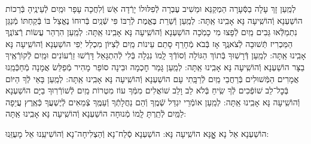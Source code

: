 \documentclass[twoside, openany, parskip=half, 11pt]{book}
\begin{document}
\begin{small}
	לְמַֽעַן זָךְ עָלָה בַסְּֿעָרָה הַמְקַנֵּא וּמֵשִׁיב עֶבְרָה
	לְֿפִלּוּלוֹ יָרְֿדָה אֵשׁ וְֿלִחֲכָה עָפָר וּמַֽיִם לְֿעֵינֶֽיהָ בְּֿרֵכוֹת הוֹשַׁעְנָא וְֿהוֹשִֽׁיעָה נָּא אָבִֽינוּ אַֽתָּה:
	לְמַֽעַן וְֿשֵׁרֵת בֶּאֱמֶת לְֿרַבּוֹ פִּי שְֿׁנַֽיִם בְּֿרוּחוֹ נֶאֱצַל בּוֹ
	בְּֿקַחְתּוֹ מְֿנַגֵּן נִתְמַלְּֿאוּ גֵּבִים מַֽיִם לְֿפָצוּ מִי כָמֹֽכָה הוֹשַׁעְנָא וְֿהוֹשִֽׁיעָה נָּא אָבִֽינוּ אַֽתָּה:
	לְמַֽעַן הִרְהֵר עֲשׂוֹת רְֿצוֹנֶֽךָ הַמַּכְרִיז תְּֿשׁוּבָה לְֿצֹאנֶֽךָ
	אָז בְּֿבֹא מְֿחָרֵף סָתַם עֵינוֹת מַֽיִם לְֿצִיּוֹן מִכְלַל יֹֽפִי הוֹשַׁעְנָא וְֿהוֹשִֽׁיעָה נָּא אָבִֽינוּ אַֽתָּה:
	לְמַֽעַן דְּֿרָשֽׁוּךָ בְּֿתוֹךְ הַגּוֹלָה וְֿסוֹדְֿךָ לָֽמוֹ נִגְלָה
	בְּֿלִי לְֿהִתְגָּאֵל דָּרְֿשׁוּ זֵרְֿעוֹנִים וּמַֽיִם לְֿקוֹרְֿאֶֽיךָ בַצָּר הוֹשַׁעְנָא וְֿהוֹשִֽׁיעָה נָּא אָבִֽינוּ אַֽתָּה:
	לְמַֽעַן גָּמַר חׇכְמָה וּבִינָה סוֹפֵר מָהִיר מְֿפַלֵּשׂ אֲמָנָה
	מְֿחַכְּֿמֵֽנוּ אֲמָרִים הַמְּֿשׁוּלִים בְּֿרַחֲבֵי מַֽיִם לְֿרַבָּֽתִי עָם הוֹשַׁעְנָא וְֿהוֹשִֽׁיעָה נָּא אָבִֽינוּ אַֽתָּה:
	לְמַֽעַן בָּאֵי לְֿךָ הַיּוֹם בְּֿכׇל־לֵב שׁוֹפְֿכִים לְֿךָ שִֽׂיחַ בְּֿלֹא לֵב וָלֵב
	שׁוֹאֲלִים מִמְּֿךָ עוֹז מִטְרוֹת מַֽיִם לְֿשׁוֹרְֿרֽוּךָ בַיָּם הוֹשַׁעְנָא וְֿהוֹשִֽׁיעָה נָּא אָבִֽינוּ אַֽתָּה:
	לְמַֽעַן אוֹמְֿרֵי יִגְדַּל שְֿׁמֶֽךָ וְֿהֵם נַחֲלָתְֿךָ וְֿעַמֶּֽךָ
	צְֿמֵאִים לְֿיֶשְׁעֲךָ כְּֿאֶֽרֶץ עֲיֵפָה לַמַּֽיִם לְֿתַֽרְתָּ לָֽמוֹ מְֿנוּחָה הוֹשַׁעְנָא וְֿהוֹשִֽׁיעָה נָּא אָבִֽינוּ אַֽתָּה:
	
\end{small}

\begin{large}
	\shatzvkahal
	הוֹשַׁעְנָא אֵל נָא אׇׇׇׇָנָּא הוֹשִֽׁיעָה נָּא:
	הוֹשַׁעְנָא סְֿלַח־נָא וְֿהַצְלִיחָה־נָא וְֿהוֹשִׁיעֵֽנוּ אֵל מָעֻזֵּֽנוּ:
	
\end{large}
\end{document}
